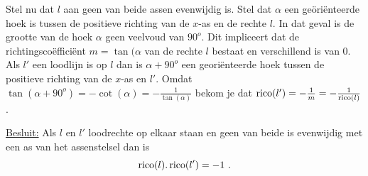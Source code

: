 \begin{voorbeeld}
Stel nu dat $l$ aan geen van beide assen evenwijdig is.
Stel dat $\alpha$ een ge\"ori\"enteerde hoek is tussen de positieve richting van de $x$-as en de rechte $l$.
In dat geval is de grootte van de hoek $\alpha$ geen veelvoud van $90^o$.
Dit impliceert dat de richtingsco\"effici\"ent $m=\tan (\alpha$ van de rechte $l$ bestaat en verschillend is van 0.
Als $l'$ een loodlijn is op $l$ dan is $\alpha + 90^o$ een geori\"enteerde hoek tussen de positieve richting van de $x$-as en $l'$.
Omdat $\tan (\alpha + 90^o)=-\cot (\alpha)=-\frac{1}{\tan (\alpha)}$  bekom je dat $\operatorname{rico} (l')=-\frac{1}{m}=-\frac{1}{\operatorname{rico} (l)}$.

\underline {Besluit:} Als $l$ en $l'$ loodrechte op elkaar staan en geen van beide is evenwijdig met een as van het assenstelsel dan is
\[
\operatorname{rico} (l).\operatorname{rico} (l')=-1 \text { .}
\]

\end{voorbeeld}


